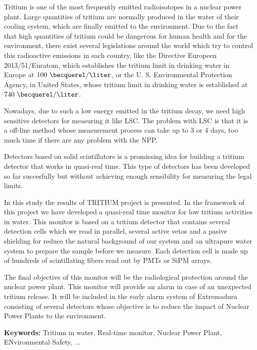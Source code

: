 Tritium is one of the most frequently emitted radioisotopes in a nuclear power plant. Large quantities of tritium are normally produced in the water of their cooling system, which are finally emitted to the environment. Due to the fact that high quantities of tritium could be dangerous for human health and for the environment, there exist several legislations around the world which try to control this radioactive emissions in each country, like the Directive Europeen 2013/51/Euratom, which establishes the tritium limit in drinking water in Europe at $100~\becquerel/\liter$, or the U. S. Environmental Protection Agency, in United States, whose tritium limit in drinking water is established at $740~\becquerel/\liter$.

Nowadays, due to such a low energy emitted in the tritium decay, we need high sensitive detectors for measuring it like LSC. The problem with LSC is that it is a off-line method whose measurement process can take up to 3 or 4 days, too much time if there are any problem with the NPP.

Detectors based on solid scintillators is a promissing idea for building a tritium detector that works in quasi-real time. This type of detectors has been developed so far succesfully but without achieving enough sensibility for measuring the legal limits.

In this study the results of TRITIUM project is presented. In the framework of this project we have developed a quasi-real time monitor for low tritium activities in water. This monitor is based on a tritium detector that contains several detection cells which we read in parallel, several active vetos and a pasive shielding for reduce the natural background of our system and an ultrapure water system to prepare the sample before we measure. Each detection cell is made up of hundreds of scintillating fibers read out by PMTs or SiPM arrays.

The final objective of this monitor will be the radiological protection around the nuclear power plant. This monitor will provide an alarm in case of an unexpected tritium release. It will be included in the early alarm system of Extremadura consisting of several detectors whose objective is to reduce the impact of Nuclear Power Plants to the environment.

\vspace{1cm}

\textbf{Keywords:} Tritium in water, Real-time monitor, Nuclear Power Plant, ENvironmental Safety, ...
